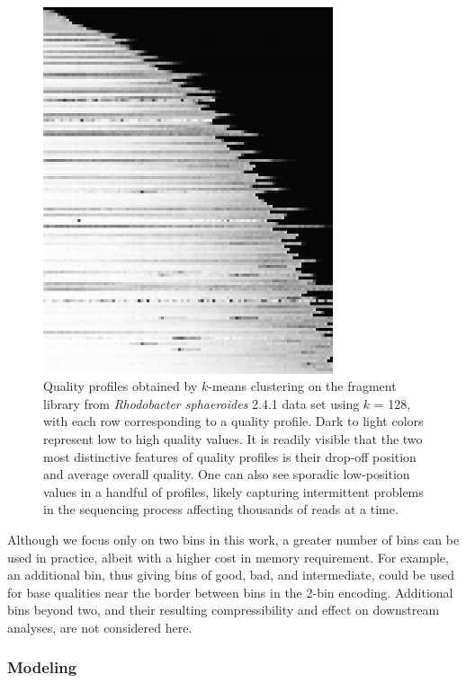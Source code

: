 \documentclass{bioinfo}
\begin{document}
\begin{methods}
\begin{figure}[!tpb]
\centerline{\includegraphics[width=3.35in]{profiles_128.png}}
\caption{Quality profiles obtained by $k$-means clustering on the
  fragment library from \textit{Rhodobacter sphaeroides} 2.4.1 data
  set using $k$ = 128, with each row corresponding to a quality
  profile. Dark to light colors represent low to high quality
  values. It is readily visible that the two most distinctive features
  of quality profiles is their drop-off position and average overall
  quality. One can also see sporadic low-position values in a handful
  of profiles, likely capturing intermittent problems in the
  sequencing process affecting thousands of reads at a
  time.}\label{fig:profiles_128}
\end{figure}

Although we focus only on two bins in this work, a greater number of
bins can be used in practice, albeit with a higher cost in memory
requirement.  For example, an additional bin, thus giving bins of
good, bad, and intermediate, could be used for base qualities near the
border between bins in the 2-bin encoding. Additional bins beyond two,
and their resulting compressibility and effect on downstream analyses,
are not considered here.

\subsubsection{Modeling}


\end{methods}
\end{document}
